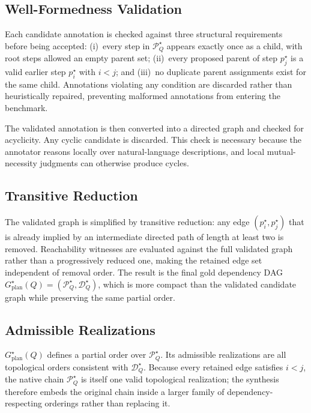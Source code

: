 \documentclass{article}
\begin{document}
\subsection{Well-Formedness Validation}
\label{subsec:appendix-synth-validation}

Each candidate annotation is checked against three structural requirements
before being accepted: (i)~every step in $\mathcal{P}_Q^\star$ appears exactly
once as a child, with root steps allowed an empty parent set; (ii)~every
proposed parent of step $p_j^\star$ is a valid earlier step $p_i^\star$ with
$i < j$; and (iii)~no duplicate parent assignments exist for the same child.
Annotations violating any condition are discarded rather than heuristically
repaired, preventing malformed annotations from entering the benchmark.

The validated annotation is then converted into a directed graph and checked for
acyclicity. Any cyclic candidate is discarded. This check is necessary because
the annotator reasons locally over natural-language descriptions, and local
mutual-necessity judgments can otherwise produce cycles.

\subsection{Transitive Reduction}
\label{subsec:appendix-synth-reduction}

The validated graph is simplified by transitive reduction: any edge
$(p_i^\star, p_j^\star)$ that is already implied by an intermediate directed
path of length at least two is removed. Reachability witnesses are evaluated
against the full validated graph rather than a progressively reduced one,
making the retained edge set independent of removal order. The result is the
final gold dependency DAG $G_{\text{plan}}^\star(Q) =
(\mathcal{P}_Q^\star, \mathcal{D}_Q^\star)$, which is more compact than the
validated candidate graph while preserving the same partial order.

\subsection{Admissible Realizations}
\label{subsec:appendix-synth-realizations}

$G_{\text{plan}}^\star(Q)$ defines a partial order over $\mathcal{P}_Q^\star$.
Its admissible realizations are all topological orders consistent with
$\mathcal{D}_Q^\star$. Because every retained edge satisfies $i < j$, the
native chain $\mathcal{P}_Q^\star$ is itself one valid topological realization;
the synthesis therefore embeds the original chain inside a larger family of
dependency-respecting orderings rather than replacing it.
\end{document}
